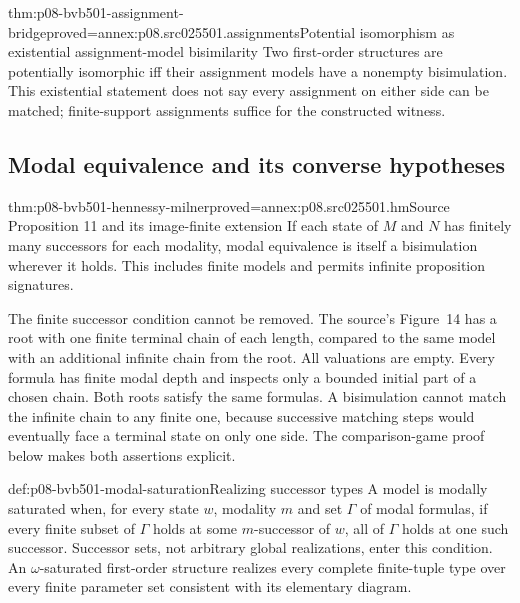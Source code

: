 \begin{hbtheorem}{thm:p08-bvb501-assignment-bridge}{proved=annex:p08.src025501.assignments}{Potential isomorphism as existential assignment-model bisimilarity}
Two first-order structures are potentially isomorphic iff their assignment
models have a nonempty bisimulation. This existential statement does not
say every assignment on either side can be matched; finite-support
assignments suffice for the constructed witness.
\end{hbtheorem}

\subsection{Modal equivalence and its converse hypotheses}
\label{sec:p08-bvb501-equivalence}

\begin{hbtheorem}{thm:p08-bvb501-hennessy-milner}{proved=annex:p08.src025501.hm}{Source Proposition 11 and its image-finite extension}
If each state of \(M\) and \(N\) has finitely many successors for
each modality, modal equivalence is itself a bisimulation wherever it holds.
This includes finite models and permits infinite proposition signatures.
\end{hbtheorem}

The finite successor condition cannot be removed. The source's Figure~14 has a root
with one finite terminal chain of each length, compared to the same model
with an additional infinite chain from the root. All valuations are empty.
Every formula has finite modal depth and inspects only a bounded initial
part of a chosen chain. Both roots satisfy the same formulas. A bisimulation
cannot match the infinite chain to any finite one, because successive
matching steps would eventually face a terminal state on only one side.
The comparison-game proof below makes both assertions explicit.

\begin{hbdefinition}{def:p08-bvb501-modal-saturation}{Realizing successor types}
A model is modally saturated when, for every state \(w\), modality \(m\)
and set \(\Gamma\) of modal formulas, if every finite subset of
\(\Gamma\) holds at some \(m\)-successor of \(w\), all of
\(\Gamma\) holds at one such successor. Successor sets, not arbitrary
global realizations, enter this condition. An \(\omega\)-saturated
first-order structure realizes every complete finite-tuple type over every
finite parameter set consistent with its elementary diagram.
\end{hbdefinition}

